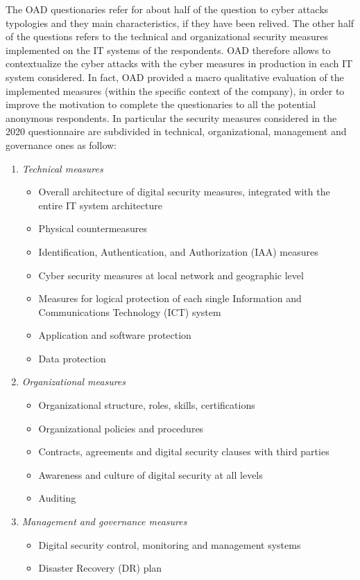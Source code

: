 \documentclass{easychair}
\begin{document}
The OAD questionaries refer for about half of the question to cyber attacks typologies and they main characteristics, if they have been relived. 
The other half of the questions refers to the technical and organizational security measures implemented on the IT systems of the respondents. 
OAD therefore allows to contextualize the cyber attacks with the cyber measures in production in each IT system considered. 
In fact, OAD provided a macro qualitative evaluation of the implemented measures (within the specific context of the company), in order to improve the motivation to 
complete the questionaries to all the potential anonymous respondents. 
In particular the security measures considered in the 2020 questionnaire are subdivided in technical, organizational, management and governance ones as follow:
\begin{enumerate}
\small
	\item \emph{Technical measures}
	\begin{itemize}
		\item Overall architecture of digital security measures, integrated with the entire IT system architecture
		\item Physical countermeasures
		\item Identification, Authentication, and Authorization (IAA) measures
		\item Cyber security measures at local network and geographic level
		\item Measures for logical protection of each single Information and Communications Technology (ICT) system
		\item Application and software protection
		\item Data protection
	\end{itemize}
	\item \emph{Organizational measures}
	\begin{itemize}
		\item Organizational structure, roles, skills, certifications
		\item Organizational policies and procedures
		\item Contracts, agreements and digital security clauses with third parties
		\item Awareness and culture of digital security at all levels
		\item Auditing
	\end{itemize}
	\item \emph{Management and governance measures}
	\begin{itemize}
		\item Digital security control, monitoring and management systems
		\item Disaster Recovery (DR) plan
	\end{itemize}
\end{enumerate}
\end{document}
